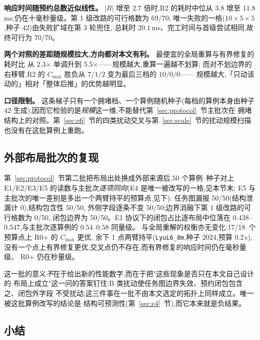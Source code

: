 \documentclass[manuscript,screen,review]{acmart}
\newcommand{\NPubPairs}{50}
\newcommand{\PubPassMiss}{\NPubPairs/\NPubPairs}
\newcommand{\PubFeasRone}{0/\NPubPairs}
\newcommand{\PubFeasRtwo}{\NPubPairs/\NPubPairs}
\newcommand{\PubPassClosed}{\NPubPairs/\NPubPairs}
\newcommand{\PubPassInvar}{\NPubPairs/\NPubPairs}
\newcommand{\PubEoneFracLo}{0.438}
\newcommand{\PubEoneFracHi}{0.547}
\newcommand{\PubEfiveNoCross}{17/18}
\newcommand{\ScalePairs}{70}
\newcommand{\ScaleMsHi}{11.8}        %
\newcommand{\ScaleRatioLo}{2.3}      %
\newcommand{\ScaleRatioHi}{5.5}      %
\newcommand{\ScaleFeasFirst}{69/\ScalePairs}   %
\newcommand{\ScaleFeasAll}{\ScalePairs/\ScalePairs}
\begin{document}
\textbf{响应时间随预约总数近似线性。} \(|R|\) 增至 \(2.7\) 倍时,R2 的耗时中位从
\(3.8\) 增至 \ScaleMsHi\,ms,仍在十毫秒量级。第 1 级改路的可行格数为 \ScaleFeasFirst;
唯一失败的一格(\(10\times5\times5\),种子 \(42\))由失败扩域在第 \(3\) 轮兜住,
总耗时 \(20.1\)\,ms、完工时间与首级尝试相同,故终可行为 \ScaleFeasAll。

\textbf{两个对照的差距随规模拉大,方向都对本文有利。} 最便宜的全局重算与有界修复的耗时比
从 \ScaleRatioLo\(\times\) 单调升到 \ScaleRatioHi\(\times\)——规模越大,重算一遍越不划算;
而对不划边界的右移臂,R2 的 \(C_{\max}\) 胜负从 \(7/1/2\) 变为最后三档的 \(10/0/0\)——
规模越大,「只动该动的」相对「整体后推」的优势越明显。

\textbf{口径限制。} 这条梯子只有一个拥堵档、一个算例随机种子(每档的算例本身由种子
\(42\) 生成),因而它检验的是\emph{规模}这一维,不能替代第~\ref{sec:protocol}~节主批次在
拥堵结构上的对照。第~\ref{sec:e6}~节的四类扰动交叉与第~\ref{sec:scale}~节的扰动规模扫描
也没有在这批算例上重跑。

\subsection{外部布局批次的复现}
\label{sec:pubrepro}

第~\ref{sec:protocol}~节第二批把布局出处换成外部来源后,\(\NPubPairs\) 个算例--种子对上
E1/E2/E3/E5 的读数与主批次\emph{逐项同向}(E4 是唯一被改写的一格,见本节末;
E5 与主批次的唯一差别是多出一个两臂持平的预算点,见下):
任务图漏报 \PubPassMiss(结构泄漏计 \(0\)),结构包含性 \PubPassClosed,
外侧字段逐条不变 \PubPassInvar;边界消融下第 1 级改路的可行格数为 \PubFeasRone,
闭包边界为 \PubFeasRtwo。E1 协议下的闭包占比逐布局中位落在
\PubEoneFracLo--\PubEoneFracHi,与主批次逐算例的 \(0.54\)--\(0.58\) 同量级。
与全局重解的权衡亦无变化:\PubEfiveNoCross\ 个预算点上 R0+ 的 \(C_{\max}\) 更优,
余下 \(1\) 点两臂持平(\texttt{LyuL6\_8m},种子 \(2024\),预算 \(0.2\)\,s),
没有一个点上有界修复更优,交叉点仍不存在,而有界修复的响应时间仍在毫秒量级、
R0+ 仍在秒量级。

这一批的意义\emph{不}在于给出新的性能数字,而在于把"这些现象是否只在本文自己设计的
布局上成立"这一问的答案钉住:B 类扰动使任务图边界失效、预约闭包包含之、闭包外字段
不受扰动,这三件事在一批不由本文选定的拓扑上同样成立。唯一被这批算例改写的结论是
结构可预测性(第~\ref{sec:e4}~节),而它本来就是负结果。

\subsection{小结}
\label{sec:exp_summary}
\end{document}
